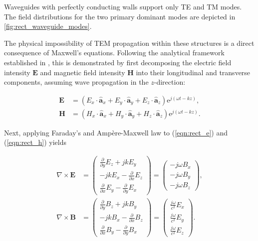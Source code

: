 Waveguides with perfectly conducting walls support only TE and TM modes. The field distributions for the two primary dominant modes are depicted in \autoref{fig:rect_waveguide_modes}. 

The physical impossibility of TEM propagation within these structures is a direct 
consequence of Maxwell’s equations. Following the analytical framework established 
in \cite[pp.~425-427]{Griffiths_2024}, this is demonstrated by first decomposing the electric field intensity $\mathbf{E}$ and magnetic field intensity $\mathbf{H}$ 
into their longitudinal and transverse components, assuming wave propagation 
in the $z$-direction:

\begin{subequations}
	\begin{align}
		\mathbf{E}&=(E_{x}\cdot\mathbf{\hat{a}}_x+E_{y}\cdot\mathbf{\hat{a}}_y+E_{z}\cdot\mathbf{\hat{a}}_z)\mathrm{e}^{j(\omega t-kz)},\label{eqn:rect_e}\\
		\mathbf{H}&=(H_{x}\cdot\mathbf{\hat{a}}_x+H_{y}\cdot\mathbf{\hat{a}}_y+H_{z}\cdot\mathbf{\hat{a}}_z)\mathrm{e}^{j(\omega t-kz)}.\label{eqn:rect_h}
	\end{align}
\end{subequations}

Next, applying Faraday's and Ampère-Maxwell law to (\ref{eqn:rect_e}) and (\ref{eqn:rect_h}) yields \cite[p.~426]{Griffiths_2024}

\begin{subequations}
\begin{align}
	\nabla \times \mathbf{E} &=\begin{pmatrix}\frac{\partial}{\partial y}E_z+jkE_y \\-jkE_x-\frac{\partial}{\partial x}E_z \\\frac{\partial}{\partial x}E_y-\frac{\partial}{\partial y}E_x\end{pmatrix}=\begin{pmatrix} -j\omega B_x\\-j\omega B_y\\ -j\omega B_z \end{pmatrix},\label{eqn:faraday}\\
	\nabla \times \mathbf{B} &=\begin{pmatrix}\frac{\partial}{\partial y}B_z+jkB_y \\-jkB_x-\frac{\partial}{\partial x}B_z \\\frac{\partial}{\partial x}B_y-\frac{\partial}{\partial y}B_x\end{pmatrix}=\begin{pmatrix} \frac{j\omega}{c^2} E_x\\\frac{j\omega}{c^2} E_y\\ \frac{j\omega}{c^2} E_z \end{pmatrix}.\label{eqn:ampere_maxwell}
\end{align}
\end{subequations}

